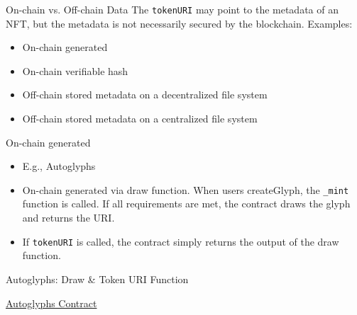 \documentclass[handout]{beamer}
\begin{document}
\begin{frame}{On-chain vs. Off-chain Data}
	The \texttt{tokenURI} may point to the metadata of an NFT, but the metadata is not necessarily secured by the blockchain. Examples:\\

	\begin{itemize}
		\item<2-> On-chain generated %
		\item<3-> On-chain verifiable hash %
		\item<4-> Off-chain stored metadata on a decentralized file system %
		\item<5-> Off-chain stored metadata on a centralized file system %
	\end{itemize}
\end{frame}

\begin{frame}{On-chain generated}
	\begin{itemize}
		\item E.g., Autoglyphs
		\item On-chain generated via draw function. When users createGlyph, the \texttt{\_mint} function is called. If all requirements are met, the contract draws the glyph and returns the URI.
		\item If \texttt{tokenURI} is called, the contract simply returns the output of the draw function.
	\end{itemize}
	\begin{samplecode}{Autoglyphs: Draw \& Token URI Function}
		
	\end{samplecode}
	\vspace{-0.5em}
	\begin{center}
		\link \href{https://etherscan.io/address/0xd4e4078ca3495de5b1d4db434bebc5a986197782}{Autoglyphs Contract}
	\end{center}
\end{frame}
\end{document}
